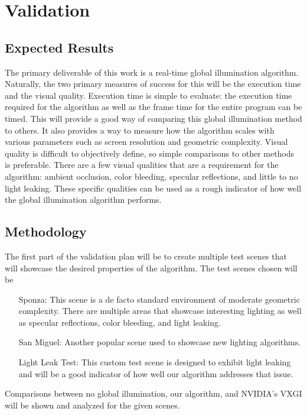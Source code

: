 \chapter{Validation}

\section{Expected Results}
The primary deliverable of this work is a real-time global illumination algorithm. Naturally, the two primary measures of success for this will be the execution time and the visual quality. Execution time is simple to evaluate: the execution time required for the algorithm as well as the frame time for the entire program can be timed. This will provide a good way of comparing this global illumination method to others. It also provides a way to measure how the algorithm scales with various parameters such as screen resolution and geometric complexity. Visual quality is difficult to objectively define, so simple comparisons to other methods is preferable. There are a few visual qualities that are a requirement for the algorithm: ambient occlusion, color bleeding, specular reflections, and little to no light leaking. These specific qualities can be used as a rough indicator of how well the global illumination algorithm performs.

\section{Methodology}
The first part of the validation plan will be to create multiple test scenes that will showcase the desired properties of the algorithm. The test scenes chosen will be

\begin{enumerate}
\item[Sponza: ] This scene is a de facto standard environment of moderate geometric complexity. There are multiple areas that showcase interesting lighting as well as specular reflections, color bleeding, and light leaking.
\item[San Miguel: ] Another popular scene used to showcase new lighting algorithms.
\item[Light Leak Test: ] This custom test scene is designed to exhibit light leaking and will be a good indicator of how well our algorithm addresses that issue.
\end{enumerate}

Comparisons between no global illumination, our algorithm, and NVIDIA's VXGI will be shown and analyzed for the given scenes.

